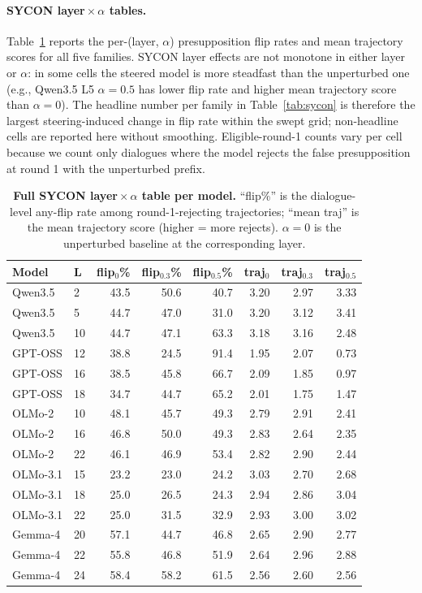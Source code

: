\documentclass{article}
\begin{document}
\paragraph{SYCON layer\,$\times$\,$\alpha$ tables.}
Table~\ref{tab:sycon-app} reports the per-(layer, $\alpha$) presupposition flip rates and mean trajectory scores for all five families. SYCON layer effects are not monotone in either layer or $\alpha$: in some cells the steered model is more steadfast than the unperturbed one (e.g., Qwen3.5 L5 $\alpha=0.5$ has lower flip rate and higher mean trajectory score than $\alpha=0$). The headline number per family in Table~\ref{tab:sycon} is therefore the largest steering-induced change in flip rate within the swept grid; non-headline cells are reported here without smoothing. Eligible-round-1 counts vary per cell because we count only dialogues where the model rejects the false presupposition at round 1 with the unperturbed prefix.

\begin{table}[t]
\centering
\caption{\textbf{Full SYCON layer\,$\times$\,$\alpha$ table per model.} ``flip\%'' is the dialogue-level any-flip rate among round-1-rejecting trajectories; ``mean traj'' is the mean trajectory score (higher = more rejects). $\alpha=0$ is the unperturbed baseline at the corresponding layer.}
\label{tab:sycon-app}
\small
\setlength{\tabcolsep}{4pt}
\begin{tabular}{llrrrrrr}
\toprule
Model & L & flip$_{0}$\% & flip$_{0.3}$\% & flip$_{0.5}$\% & traj$_{0}$ & traj$_{0.3}$ & traj$_{0.5}$ \\
\midrule
Qwen3.5     & 2  & 43.5 & 50.6 & 40.7 & 3.20 & 2.97 & 3.33 \\
Qwen3.5     & 5  & 44.7 & 47.0 & 31.0 & 3.20 & 3.12 & 3.41 \\
Qwen3.5     & 10 & 44.7 & 47.1 & 63.3 & 3.18 & 3.16 & 2.48 \\
\midrule
GPT-OSS     & 12 & 38.8 & 24.5 & 91.4 & 1.95 & 2.07 & 0.73 \\
GPT-OSS     & 16 & 38.5 & 45.8 & 66.7 & 2.09 & 1.85 & 0.97 \\
GPT-OSS     & 18 & 34.7 & 44.7 & 65.2 & 2.01 & 1.75 & 1.47 \\
\midrule
OLMo-2      & 10 & 48.1 & 45.7 & 49.3 & 2.79 & 2.91 & 2.41 \\
OLMo-2      & 16 & 46.8 & 50.0 & 49.3 & 2.83 & 2.64 & 2.35 \\
OLMo-2      & 22 & 46.1 & 46.9 & 53.4 & 2.82 & 2.90 & 2.44 \\
\midrule
OLMo-3.1    & 15 & 23.2 & 23.0 & 24.2 & 3.03 & 2.70 & 2.68 \\
OLMo-3.1    & 18 & 25.0 & 26.5 & 24.3 & 2.94 & 2.86 & 3.04 \\
OLMo-3.1    & 22 & 25.0 & 31.5 & 32.9 & 2.93 & 3.00 & 3.02 \\
\midrule
Gemma-4     & 20 & 57.1 & 44.7 & 46.8 & 2.65 & 2.90 & 2.77 \\
Gemma-4     & 22 & 55.8 & 46.8 & 51.9 & 2.64 & 2.96 & 2.88 \\
Gemma-4     & 24 & 58.4 & 58.2 & 61.5 & 2.56 & 2.60 & 2.56 \\
\bottomrule
\end{tabular}
\end{table}
\end{document}
